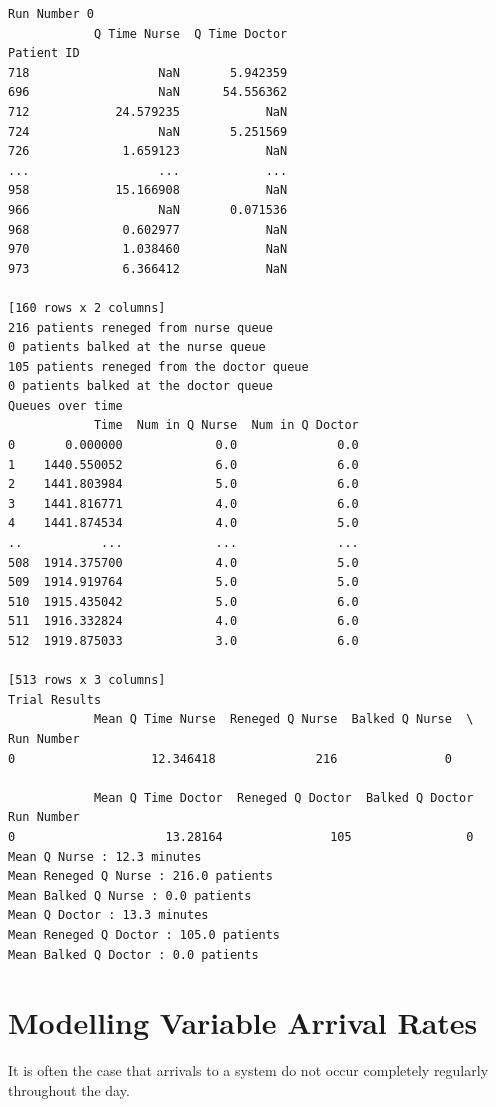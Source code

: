 \documentclass[
  letterpaper,
  DIV=11,
  numbers=noendperiod]{scrreprt}
\begin{document}
\begin{verbatim}
Run Number 0
            Q Time Nurse  Q Time Doctor
Patient ID                             
718                  NaN       5.942359
696                  NaN      54.556362
712            24.579235            NaN
724                  NaN       5.251569
726             1.659123            NaN
...                  ...            ...
958            15.166908            NaN
966                  NaN       0.071536
968             0.602977            NaN
970             1.038460            NaN
973             6.366412            NaN

[160 rows x 2 columns]
216 patients reneged from nurse queue
0 patients balked at the nurse queue
105 patients reneged from the doctor queue
0 patients balked at the doctor queue
Queues over time
            Time  Num in Q Nurse  Num in Q Doctor
0       0.000000             0.0              0.0
1    1440.550052             6.0              6.0
2    1441.803984             5.0              6.0
3    1441.816771             4.0              6.0
4    1441.874534             4.0              5.0
..           ...             ...              ...
508  1914.375700             4.0              5.0
509  1914.919764             5.0              5.0
510  1915.435042             5.0              6.0
511  1916.332824             4.0              6.0
512  1919.875033             3.0              6.0

[513 rows x 3 columns]
Trial Results
            Mean Q Time Nurse  Reneged Q Nurse  Balked Q Nurse  \
Run Number                                                       
0                   12.346418              216               0   

            Mean Q Time Doctor  Reneged Q Doctor  Balked Q Doctor  
Run Number                                                         
0                     13.28164               105                0  
Mean Q Nurse : 12.3 minutes
Mean Reneged Q Nurse : 216.0 patients
Mean Balked Q Nurse : 0.0 patients
Mean Q Doctor : 13.3 minutes
Mean Reneged Q Doctor : 105.0 patients
Mean Balked Q Doctor : 0.0 patients
\end{verbatim}

\chapter{Modelling Variable Arrival
Rates}\label{modelling-variable-arrival-rates}

It is often the case that arrivals to a system do not occur completely
regularly throughout the day.
\end{document}
